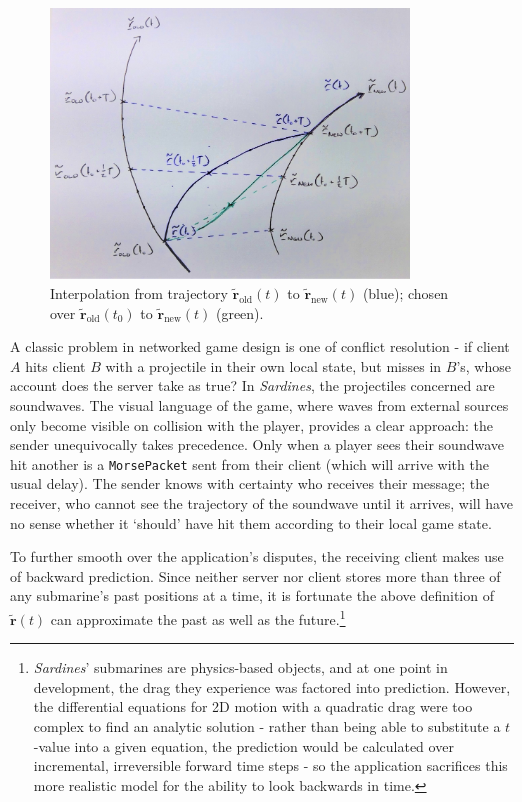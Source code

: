 \documentclass[a4paper, 9pt]{article}
\begin{document}
\begin{flushleft}
\begin{figure}[h]
\centering
\includegraphics[width=0.85\textwidth]{Interpolation}
\caption{Interpolation from trajectory $\mathbf{\tilde{r}}_{\textrm{old}}(t)$ to $\mathbf{\tilde{r}}_{\textrm{new}}(t)$ (blue); chosen over $\mathbf{\tilde{r}}_{\textrm{old}}(t_0)$ to $\mathbf{\tilde{r}}_{\textrm{new}}(t)$ (green).}
\label{Interpolation}
\end{figure}

\vspace{5pt}\noindent
A classic problem in networked game design is one of conflict resolution - if client $A$ hits client $B$ with a projectile in their own local state, but misses in $B$'s, whose account does the server take as true? In \textit{Sardines}, the projectiles concerned are soundwaves. The visual language of the game, where waves from external sources only become visible on collision with the player, provides a clear approach: the sender unequivocally takes precedence. Only when a player sees their soundwave hit another is a \texttt{MorsePacket} sent from their client (which will arrive with the usual delay). The sender knows with certainty who receives their message; the receiver, who cannot see the trajectory of the soundwave until it arrives, will have no sense whether it `should' have hit them according to their local game state.

\vspace{5pt}\noindent
To further smooth over the application's disputes, the receiving client makes use of backward prediction. Since neither server nor client stores more than three of any submarine's past positions at a time, it is fortunate the above definition of $\mathbf{\tilde{r}}(t)$ can approximate the past as well as the future.\footnote{\textit{Sardines}' submarines are physics-based objects, and at one point in development, the drag they experience was factored into prediction. However, the differential equations for 2D motion with a quadratic drag were too complex to find an analytic solution - rather than being able to substitute a $t$-value into a given equation, the prediction would be calculated over incremental, irreversible forward time steps - so the application sacrifices this more realistic model for the ability to look backwards in time.}


\end{flushleft}
\end{document}
